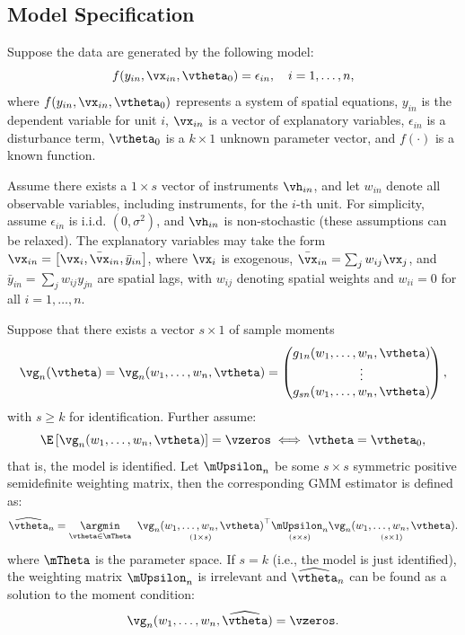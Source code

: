 \documentclass[english,12pt]{book}\usepackage[]{graphicx}\usepackage[]{xcolor}
\begin{document}
\subsection{Model Specification}

Suppose the data are generated by the following model:
\begin{equation*}
f(y_{in}, \vx_{in}, \vtheta_0) = \epsilon_{in}, \quad i = 1, \ldots, n,
\end{equation*}
%
where $f(y_{in}, \vx_{in}, \vtheta_0)$ represents a system of spatial equations, $y_{in}$ is the dependent variable for unit $i$, $\vx_{in}$ is a vector of explanatory variables, $\epsilon_{in}$ is a disturbance term, $\vtheta_0$ is a $k \times 1$ unknown parameter vector, and $f(\cdot)$ is a known function.

Assume there exists a $1 \times s$ vector of instruments $\vh_{in}$, and let $w_{in}$ denote all observable variables, including instruments, for the $i$-th unit. For simplicity, assume $\epsilon_{in}$ is i.i.d. $(0, \sigma^2)$, and $\vh_{in}$ is non-stochastic (these assumptions can be relaxed). The explanatory variables may take the form $\vx_{in} = \left[ \vx_i, \bar{\vx}_{in}, \bar{y}_{in} \right]$, where $\vx_i$ is exogenous, $\bar{\vx}_{in} = \sum_j w_{ij} \vx_j$, and  $\bar{y}_{in} = \sum_j w_{ij} y_{jn}$ are spatial lags, with $w_{ij}$ denoting spatial weights and $w_{ii} = 0$ for all $i = 1, \ldots, n$.


Suppose that there exists a vector $s \times 1$ of sample moments
\begin{equation}\label{eq:sample_moments_gmm}
\vg_n(\vtheta) = \vg_n(w_1, \ldots ,w_n, \vtheta) 
= \begin{pmatrix}
g_{1n}(w_1,\ldots,w_n, \vtheta) \\
\vdots \\
g_{sn}(w_1,\ldots,w_n, \vtheta)
\end{pmatrix},
\end{equation}
%
with $s \geq k$ for identification. Further assume:
\begin{equation*}
\E\left[\vg_n(w_1,\ldots ,w_n, \vtheta)\right] = \vzeros \iff \vtheta = \vtheta_0,
\end{equation*}
%
that is, the model is identified. Let $\mUpsilon_n$ be some $s \times s$ symmetric positive semidefinite weighting matrix, then the corresponding GMM estimator is defined as:
\begin{equation}\label{eq:gmm_one_step}
\widehat{\vtheta}_n = \underset{\vtheta \in \mTheta}{\argmin}\;\;\underset{(1\times s)}{\vg_n(w_1,\ldots,w_n, \vtheta)}^\top\underset{(s\times s)}{\mUpsilon_n}\underset{(s\times 1)}{\vg_n(w_1,\ldots,w_n, \vtheta)}.
\end{equation}
%
where $\mTheta$ is the parameter space. If $s = k$ (i.e., the model is just identified),  the weighting matrix $\mUpsilon_n$ is irrelevant and $\widehat{\vtheta}_n$ can be found as a solution to the moment condition:
\begin{equation}
\vg_n(w_1,\ldots,w_n, \widehat{\vtheta}) = \vzeros.
\end{equation}
\end{document}
